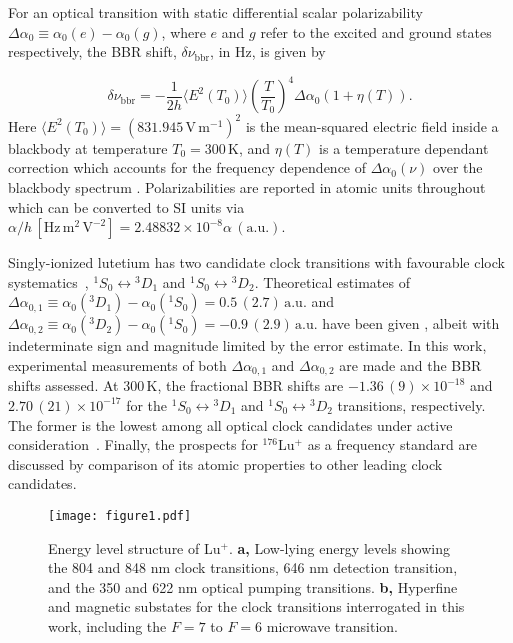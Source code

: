 \documentclass[pra,aps,showpacs,floatfix,twocolumn,nofootinbib,citeautoscript]{revtex4-1}
\begin{document}
For an optical transition with static differential scalar polarizability $\Delta \alpha_0 \equiv \alpha_0(e) - \alpha_0(g)$, where $e$ and $g$ refer to the excited and ground states respectively, the BBR shift, $\delta \nu_{\mathrm{bbr}}$, in Hz, is given by~\cite{porsev2006multipolar}

\begin{equation}
\label{eq:bbr}
 \delta \nu_{\mathrm{bbr}} = -\frac{1}{2h} \langle {E^2(T_0)}\rangle \left( \frac{T}{T_0}\right)^4 \Delta \alpha_0 (1+\eta(T)).
 \end{equation}
Here $\langle {E^2(T_0)}\rangle=(831.945\, \mathrm{V}\,\mathrm{m}^{-1})^2$ is the mean-squared electric field inside a blackbody at temperature $T_0 = 300\,\mathrm{K}$, and $\eta(T)$ is a temperature dependant correction which accounts for the frequency dependence of $\Delta \alpha_0(\nu)$ over the blackbody spectrum \cite{porsev2006multipolar}. Polarizabilities are reported in atomic units throughout which can be converted to SI units via $\alpha/h\,[\mathrm{Hz}\,\mathrm{m}^2\,\mathrm{V}^{-2}] = 2.48832\times10^{-8}\alpha\,(\mathrm{a.u.})$.

Singly-ionized lutetium has two candidate clock transitions with favourable clock systematics~\cite{MDB1,MDB2}, $^1S_0 \leftrightarrow {^3}D_1$ and $^1S_0 \leftrightarrow {^3}D_2$. Theoretical estimates of $\Delta \alpha_{0,1} \equiv \alpha_0(^3D_1)-\alpha_0(^1S_0) = 0.5 \,(2.7)\,\mathrm{a.u.}$  and $\Delta \alpha_{0,2} \equiv \alpha_0(^3D_2)-\alpha_0(^1S_0) = -0.9 \,(2.9)\,\mathrm{a.u.}$ have been given \cite{luprop2016,kozlov2014optical}, albeit with indeterminate sign and magnitude limited by the error estimate.  In this work, experimental measurements of both $\Delta \alpha_{0,1}$ and $\Delta \alpha_{0,2}$ are made and the BBR shifts assessed.  At 300$\,\mathrm{K}$, the fractional BBR shifts are $-1.36\,(9) \times 10^{-18}$ and $2.70 \,(21) \times10^{-17}$ for the $^1S_0 \leftrightarrow {^3D_1}$  and $^1S_0 \leftrightarrow {^3D_2}$ transitions, respectively. The former is the lowest among all optical clock candidates under active consideration~\cite{ludlow2015optical}. Finally, the prospects for $^{176}$Lu$^+$ as a frequency standard are discussed by comparison of its atomic properties to other leading clock candidates.  \\


 \begin{figure}
\texttt{[image: figure1.pdf]}

\caption{Energy level structure of Lu$^+$. {\bf a,} Low-lying energy levels showing the 804 and 848 nm clock transitions, 646 nm detection transition, and the 350 and 622 nm optical pumping transitions. {\bf b,} Hyperfine and magnetic substates for the clock transitions interrogated in this work, including the $F=7$ to $F=6$ microwave transition.}
\label{fig:levels}
\end{figure}
\end{document}
